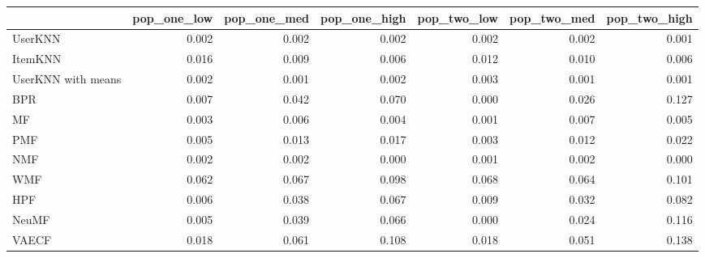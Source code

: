 \begin{tabular}{lrrrrrr}
\toprule
{} &  pop\_one\_low &  pop\_one\_med &  pop\_one\_high &  pop\_two\_low &  pop\_two\_med &  pop\_two\_high \\
\midrule
UserKNN            &        0.002 &        0.002 &         0.002 &        0.002 &        0.002 &         0.001 \\
ItemKNN            &        0.016 &        0.009 &         0.006 &        0.012 &        0.010 &         0.006 \\
UserKNN with means &        0.002 &        0.001 &         0.002 &        0.003 &        0.001 &         0.001 \\
BPR                &        0.007 &        0.042 &         0.070 &        0.000 &        0.026 &         0.127 \\
MF                 &        0.003 &        0.006 &         0.004 &        0.001 &        0.007 &         0.005 \\
PMF                &        0.005 &        0.013 &         0.017 &        0.003 &        0.012 &         0.022 \\
NMF                &        0.002 &        0.002 &         0.000 &        0.001 &        0.002 &         0.000 \\
WMF                &        0.062 &        0.067 &         0.098 &        0.068 &        0.064 &         0.101 \\
HPF                &        0.006 &        0.038 &         0.067 &        0.009 &        0.032 &         0.082 \\
NeuMF              &        0.005 &        0.039 &         0.066 &        0.000 &        0.024 &         0.116 \\
VAECF              &        0.018 &        0.061 &         0.108 &        0.018 &        0.051 &         0.138 \\
\bottomrule
\end{tabular}
